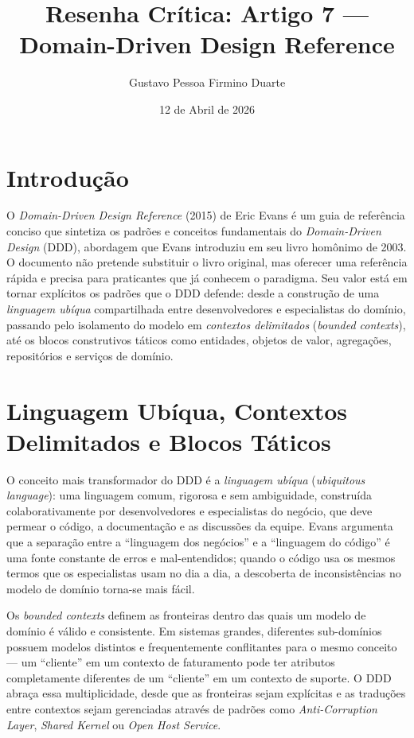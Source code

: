 \documentclass[12pt,a4paper]{article}
\title{Resenha Cr\'itica: Artigo 7 ---\\
Domain-Driven Design Reference}
\author{Gustavo Pessoa Firmino Duarte}
\date{12 de Abril de 2026}
\begin{document}
\maketitle

\section{Introdu\c{c}\~ao}

O \textit{Domain-Driven Design Reference} (2015) de Eric Evans \'e um guia de
refer\^encia conciso que sintetiza os padr\~oes e conceitos fundamentais do
\textit{Domain-Driven Design} (DDD), abordagem que Evans introduziu em seu livro
hom\^onimo de 2003. O documento n\~ao pretende substituir o livro original, mas
oferecer uma refer\^encia r\'apida e precisa para praticantes que j\'a conhecem
o paradigma. Seu valor est\'a em tornar expl\'icitos os padr\~oes que o DDD defende:
desde a constru\c{c}\~ao de uma \textit{linguagem ub\'iqua} compartilhada entre
desenvolvedores e especialistas do dom\'inio, passando pelo isolamento do modelo
em \textit{contextos delimitados} (\textit{bounded contexts}), at\'e os blocos
construtivos t\'aticos como entidades, objetos de valor, agrega\c{c}\~oes,
reposit\'orios e servi\c{c}os de dom\'inio.

\section{Linguagem Ub\'iqua, Contextos Delimitados e Blocos T\'aticos}

O conceito mais transformador do DDD \'e a \textit{linguagem ub\'iqua}
(\textit{ubiquitous language}): uma linguagem comum, rigorosa e sem ambiguidade,
constru\'ida colaborativamente por desenvolvedores e especialistas do neg\'ocio,
que deve permear o c\'odigo, a documenta\c{c}\~ao e as discuss\~oes da equipe.
Evans argumenta que a separa\c{c}\~ao entre a ``linguagem dos neg\'ocios'' e a
``linguagem do c\'odigo'' \'e uma fonte constante de erros e mal-entendidos;
quando o c\'odigo usa os mesmos termos que os especialistas usam no dia a dia, a
descoberta de inconsist\^encias no modelo de dom\'inio torna-se mais f\'acil.

Os \textit{bounded contexts} definem as fronteiras dentro das quais um modelo de
dom\'inio \'e v\'alido e consistente. Em sistemas grandes, diferentes sub-dom\'inios
possuem modelos distintos e frequentemente conflitantes para o mesmo conceito ---
um ``cliente'' em um contexto de faturamento pode ter atributos completamente
diferentes de um ``cliente'' em um contexto de suporte. O DDD abraça essa
multiplicidade, desde que as fronteiras sejam expl\'icitas e as tradu\c{c}\~oes
entre contextos sejam gerenciadas atrav\'es de padr\~oes como \textit{Anti-Corruption
Layer}, \textit{Shared Kernel} ou \textit{Open Host Service}.
\end{document}
